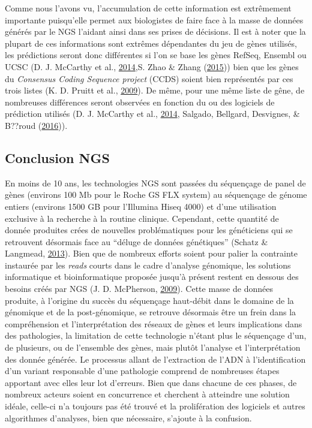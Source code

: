 \documentclass[12pt,twoside]{reedthesis}
\theoremstyle{definition}
\theoremstyle{definition}
\theoremstyle{remark}
\begin{document}
  Comme nous l'avons vu, l'accumulation de cette information est
  extrêmement importante puisqu'elle permet aux biologistes de faire face
  à la masse de données générés par le NGS l'aidant ainsi dans ses prises
  de décisions. Il est à noter que la plupart de ces informations sont
  extrêmes dépendantes du jeu de gènes utilisés, les prédictions seront
  donc différentes si l'on se base les gènes RefSeq, Ensembl ou UCSC (D.
  J. McCarthy et al., \protect\hyperlink{ref-McCarthy2014}{2014},S. Zhao
  \& Zhang (\protect\hyperlink{ref-Zhao2015}{2015})) bien que les gènes du
  \emph{Consensus Coding Sequence project} (CCDS) soient bien représentés
  par ces trois listes (K. D. Pruitt et al.,
  \protect\hyperlink{ref-Pruitt2009}{2009}). De même, pour une même liste
  de gêne, de nombreuses différences seront observées en fonction du ou
  des logiciels de prédiction utilisés (D. J. McCarthy et al.,
  \protect\hyperlink{ref-McCarthy2014}{2014}, Salgado, Bellgard,
  Desvignes, \& B??roud (\protect\hyperlink{ref-Salgado2016}{2016})).
  
  \subsection{Conclusion NGS}\label{conclusion-ngs}
  
  En moins de 10 ans, les technologies NGS sont passées du séquençage de
  panel de gènes (environs 100 Mb pour le Roche GS FLX system) au
  séquençage de génome entiers (environs 1500 GB pour l'Illumina Hiseq
  4000) et d'une utilisation exclusive à la recherche à la routine
  clinique. Cependant, cette quantité de donnée produites crées de
  nouvelles problématiques pour les généticiens qui se retrouvent
  désormais face au ``déluge de données génétiques'' (Schatz \& Langmead,
  \protect\hyperlink{ref-Schatz2013}{2013}). Bien que de nombreux efforts
  soient pour palier la contrainte instaurée par les \emph{reads} courts
  dans le cadre d'analyse génomique, les solutions informatique et
  bioinformatique proposée jusqu'à présent restent en dessous des besoins
  créés par NGS (J. D. McPherson,
  \protect\hyperlink{ref-McPherson2009}{2009}). Cette masse de données
  produite, à l'origine du succès du séquençage haut-débit dans le domaine
  de la génomique et de la post-génomique, se retrouve désormais être un
  frein dans la compréhension et l'interprétation des réseaux de gènes et
  leurs implications dans des pathologies, la limitation de cette
  technologie n'étant plus le séquençage d'un, de plusieurs, ou de
  l'ensemble des gènes, mais plutôt l'analyse et l'interprétation des
  donnée générée. Le processus allant de l'extraction de l'ADN à
  l'identification d'un variant responsable d'une pathologie comprend de
  nombreuses étapes apportant avec elles leur lot d'erreurs. Bien que dans
  chacune de ces phases, de nombreux acteurs soient en concurrence et
  cherchent à atteindre une solution idéale, celle-ci n'a toujours pas été
  trouvé et la prolifération des logiciels et autres algorithmes
  d'analyses, bien que nécessaire, s'ajoute à la confusion.
  
\end{document}
